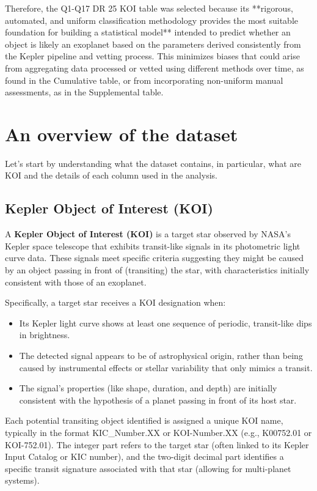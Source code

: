 Therefore, the Q1-Q17 DR 25 KOI table was selected because its **rigorous, automated, and uniform classification methodology provides the most suitable foundation for building a statistical model** intended to predict whether an object is likely an exoplanet based on the parameters derived consistently from the Kepler pipeline and vetting process. This minimizes biases that could arise from aggregating data processed or vetted using different methods over time, as found in the Cumulative table, or from incorporating non-uniform manual assessments, as in the Supplemental table.

\section{An overview of the dataset}
Let's start by understanding what the dataset contains, in particular, what are KOI and the details of each column used in the analysis.

\subsection{Kepler Object of Interest (KOI)}
A \textbf{Kepler Object of Interest (KOI)} is a target star observed by NASA's Kepler space telescope that exhibits transit-like signals in its photometric light curve data. These signals meet specific criteria suggesting they might be caused by an object passing in front of (transiting) the star, with characteristics initially consistent with those of an exoplanet.

Specifically, a target star receives a KOI designation when:
\begin{itemize}
    \item Its Kepler light curve shows at least one sequence of periodic, transit-like dips in brightness.
    \item The detected signal appears to be of astrophysical origin, rather than being caused by instrumental effects or stellar variability that only mimics a transit.
    \item The signal's properties (like shape, duration, and depth) are initially consistent with the hypothesis of a planet passing in front of its host star.
\end{itemize}

Each potential transiting object identified is assigned a unique KOI name, typically in the format KIC\_Number.XX or KOI-Number.XX (e.g., K00752.01 or KOI-752.01). The integer part refers to the target star (often linked to its Kepler Input Catalog or KIC number), and the two-digit decimal part identifies a specific transit signature associated with that star (allowing for multi-planet systems).

